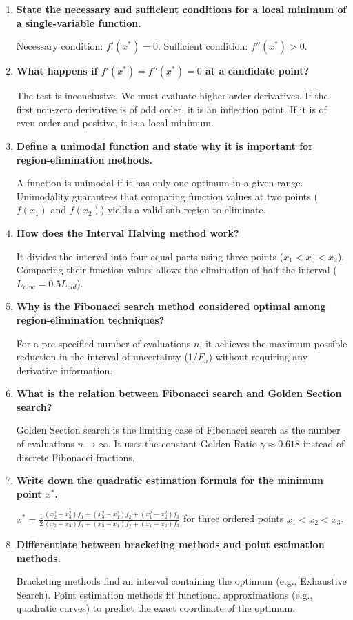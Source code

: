 \documentclass[12pt,a4paper]{article}
\newcommand{\Q}[1]{\textbf{#1}\par\noindent\ignorespaces}
\begin{document}
\begin{tcolorbox}[exambox, title={\textbf{Frequently Asked / Viva Questions}}]
\begin{enumerate}[topsep=0pt, label=\textbf{Q\arabic*.}, itemsep=5pt]
  \item \Q{State the necessary and sufficient conditions for a local minimum of a single-variable function.}
    Necessary condition: $f'(x^*) = 0$. Sufficient condition: $f''(x^*) > 0$.
  \item \Q{What happens if $f'(x^*) = f''(x^*) = 0$ at a candidate point?}
    The test is inconclusive. We must evaluate higher-order derivatives. If the first non-zero derivative is of odd order, it is an inflection point. If it is of even order and positive, it is a local minimum.
  \item \Q{Define a unimodal function and state why it is important for region-elimination methods.}
    A function is unimodal if it has only one optimum in a given range. Unimodality guarantees that comparing function values at two points ($f(x_1)$ and $f(x_2)$) yields a valid sub-region to eliminate.
  \item \Q{How does the Interval Halving method work?}
    It divides the interval into four equal parts using three points ($x_1 < x_0 < x_2$). Comparing their function values allows the elimination of half the interval ($L_{new} = 0.5 L_{old}$).
  \item \Q{Why is the Fibonacci search method considered optimal among region-elimination techniques?}
    For a pre-specified number of evaluations $n$, it achieves the maximum possible reduction in the interval of uncertainty ($1/F_n$) without requiring any derivative information.
  \item \Q{What is the relation between Fibonacci search and Golden Section search?}
    Golden Section search is the limiting case of Fibonacci search as the number of evaluations $n \to \infty$. It uses the constant Golden Ratio $\gamma \approx 0.618$ instead of discrete Fibonacci fractions.
  \item \Q{Write down the quadratic estimation formula for the minimum point $x^*$.}
    $x^* = \frac{1}{2} \frac{(x_2^2 - x_3^2)f_1 + (x_3^2 - x_1^2)f_2 + (x_1^2 - x_2^2)f_3}{(x_2 - x_3)f_1 + (x_3 - x_1)f_2 + (x_1 - x_2)f_3}$ for three ordered points $x_1 < x_2 < x_3$.
  \item \Q{Differentiate between bracketing methods and point estimation methods.}
    Bracketing methods find an interval containing the optimum (e.g., Exhaustive Search). Point estimation methods fit functional approximations (e.g., quadratic curves) to predict the exact coordinate of the optimum.

\end{enumerate}
\end{tcolorbox}
\end{document}
